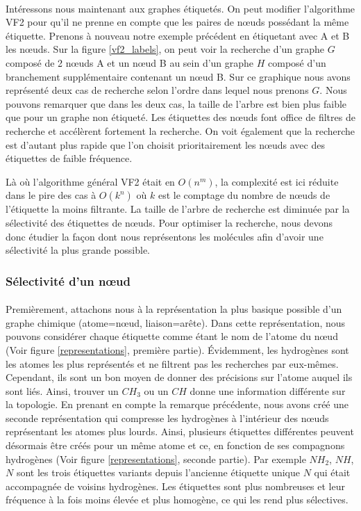 \documentclass[12pt,french,twoside]{report}
\begin{document}
\paragraph{}Intéressons nous maintenant aux graphes étiquetés.
On peut modifier l'algorithme VF2 pour qu'il ne prenne en compte que les paires de n\oe{}uds possédant la même étiquette.
Prenons à nouveau notre exemple précédent en étiquetant avec A et B les n\oe{}uds.
Sur la figure \ref{vf2_labels}, on peut voir la recherche d'un graphe $G$ composé de 2 n\oe{}uds A et un n\oe{}ud B au sein d'un graphe $H$
composé d'un branchement supplémentaire contenant un n\oe{}ud B.
Sur ce graphique nous avons représenté deux cas de recherche selon l'ordre dans lequel nous prenons $G$.
Nous pouvons remarquer que dans les deux cas, la taille de l'arbre est bien plus faible que pour un graphe non étiqueté.
Les étiquettes des n\oe{}uds font office de filtres de recherche et accélèrent fortement la recherche.
On voit également que la recherche est d'autant plus rapide que l'on choisit prioritairement les n\oe{}uds avec des étiquettes de faible
fréquence.

Là où l'algorithme général VF2 était en $O(n^m)$, la complexité est ici réduite dans le pire des cas à $O(k^n)$ où $k$ est le
comptage du nombre de n\oe{}uds de l'étiquette la moins filtrante.
La taille de l'arbre de recherche est diminuée par la sélectivité des étiquettes de n\oe{}uds.
Pour optimiser la recherche, nous devons donc étudier la façon dont nous représentons les molécules afin d'avoir une sélectivité
la plus grande possible.

\subsubsection{Sélectivité d'un n\oe{}ud}

\paragraph{}Premièrement, attachons nous à la représentation la plus basique possible d'un graphe chimique (atome=n\oe{}ud,
liaison=arête). Dans cette représentation, nous pouvons considérer chaque étiquette comme étant le nom de l'atome du n\oe{}ud (Voir
figure \ref{representations}, première partie). Évidemment, les hydrogènes sont les atomes les plus représentés et ne filtrent
pas les recherches par eux-mêmes. Cependant, ils sont un bon moyen de donner des précisions sur l'atome auquel ils sont liés.
Ainsi, trouver un $CH_{3}$ ou un $CH$ donne une information différente sur la topologie.
En prenant en compte la remarque précédente, nous avons créé une seconde représentation qui compresse les hydrogènes à l'intérieur
des n\oe{}uds représentant les atomes plus lourds.
Ainsi, plusieurs étiquettes différentes peuvent
désormais être créés pour un même atome et ce, en fonction de ses compagnons hydrogènes (Voir figure \ref{representations},
seconde partie). Par exemple $NH_2$, $NH$, $N$ sont les
trois étiquettes variants depuis l'ancienne étiquette unique $N$ qui était accompagnée de voisins hydrogènes. Les étiquettes sont plus nombreuses et leur fréquence à la fois moins élevée et plus homogène, ce qui les rend plus sélectives.
\end{document}
